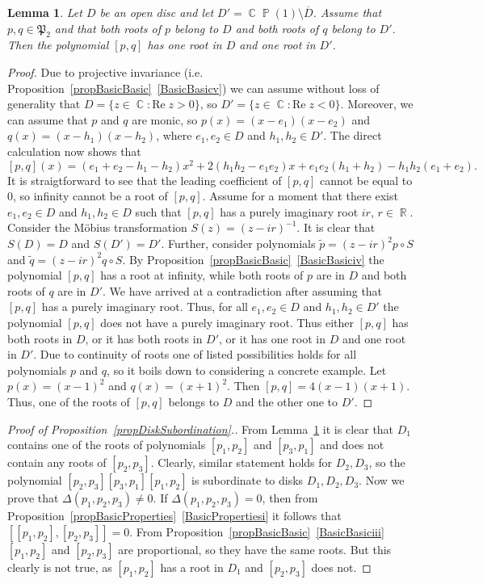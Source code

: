 \documentclass{amsart}
\numberwithin{equation}{section}
\newtheorem{lemma}[theorem]{Lemma}
\theoremstyle{definition}
\theoremstyle{remark}
\DeclareMathOperator{\CC}{\mathbb C}
\DeclareMathOperator{\RR}{\mathbb R}
\DeclareMathOperator{\PP}{\mathbb P}
\begin{document}
	\begin{lemma}\label{lemDiskSubordination}
		Let $D$ be an open disc and let $D' = \CC\PP(1) \setminus \overline{D}$. Assume that $p,q \in \mathfrak P_2$ and that both roots of $p$ belong to $D$ and both roots of $q$ belong to $D'$. Then the polynomial $[p,q]$ has one root in $D$ and one root in $D'$.
	\end{lemma}
	\begin{proof}
		Due to projective invariance (i.e. Proposition~\ref{propBasicBasic}~\ref{BasicBasicv}) we can assume without loss of generality that $D = \{z \in \CC: \mathrm{Re}\;z > 0\}$, so $D' = \{z \in \CC: \mathrm{Re}\;z < 0\}$. Moreover, we can assume that $p$ and $q$ are monic, so $p(x) = (x - e_1)(x - e_2)$ and $q(x) = (x - h_1)(x - h_2)$, where $e_1, e_2 \in D$ and $h_1,h_2 \in D'$. The direct calculation now shows that
		\[
		[p,q](x) = (e_1 + e_2 - h_1 - h_2)x^2 + 2(h_1h_2 - e_1e_2)x + e_1e_2(h_1 + h_2) - h_1h_2(e_1 + e_2).
		\]
		It is straigtforward to see that the leading coefficient of $[p,q]$ cannot be equal to $0$, so infinity cannot be a root of $[p,q]$. Assume for a moment that there exist $e_1,e_2 \in D$ and $h_1,h_2 \in D$ such that $[p,q]$ has a purely imaginary root $ir$, $r \in \RR$. Consider the M\"obius transformation $S(z) = (z - ir)^{-1}$. It is clear that $S(D) = D$ and $S(D') = D'$. Further, consider polynomials $\tilde p = (z - ir)^2p\circ S$ and $\tilde q = (z - ir)^2q \circ S$. By Proposition~\ref{propBasicBasic}~\ref{BasicBasiciv} the polynomial $[p,q]$ has a root at infinity, while both roots of $p$ are in $D$ and both roots of $q$ are in $D'$. We have arrived at a contradiction after assuming that $[p,q]$ has a purely imaginary root. Thus, for all $e_1,e_2 \in D$ and $h_1,h_2 \in D'$ the polynomial $[p,q]$ does not have a purely imaginary root. Thus either $[p,q]$ has both roots in $D$, or it has both roots in $D'$, or it has one root in $D$ and one root in $D'$. Due to continuity of roots one of listed possibilities holds for all polynomials $p$ and $q$, so it boils down to considering a concrete example. Let $p(x) = (x - 1)^2$ and $q(x) = (x + 1)^2$. Then $[p,q] = 4(x -1)(x + 1)$. Thus, one of the roots of $[p,q]$ belongs to $D$ and the other one to $D'$.
	\end{proof}
	
	\begin{proof}[Proof of Proposition~\ref{propDiskSubordination}.]
		From Lemma~\ref{lemDiskSubordination} it is clear that $D_1$ contains one of the roots of polynomials $[p_1,p_2]$ and $[p_3,p_1]$ and does not contain any roots of $[p_2,p_3]$. Clearly, similar statement holds for $D_2, D_3$, so the polynomial $[p_2,p_3][p_3, p_1][p_1,p_2]$ is subordinate to disks $D_1, D_2, D_3$. Now we prove that $\Delta(p_1,p_2,p_3) \ne 0$. If $\Delta(p_1,p_2,p_3) = 0$, then from Proposition~\ref{propBasicProperties}~\ref{BasicPropertiesi} it follows that $[[p_1,p_2], [p_2,p_3]] = 0$. From Proposition~\ref{propBasicBasic}~\ref{BasicBasiciii} $[p_1,p_2]$ and $[p_2,p_3]$ are proportional, so they have the same roots. But this clearly is not true, as $[p_1,p_2]$ has a root in $D_1$ and $[p_2,p_3]$ does not.
	\end{proof}
	
\end{document}
